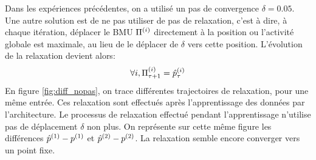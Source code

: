 \documentclass[../main]{subfiles}
\begin{document}
Dans les expériences précédentes, on a utilisé un pas de convergence $\delta=0.05$. Une autre solution est de ne pas utiliser de pas de relaxation, c'est à dire, à chaque itération, déplacer le BMU $\Pi^{({i})}$ directement à la position ou l'activité globale est maximale, au lieu de le déplacer de $\delta$ vers cette position.
L'évolution de la relaxation devient alors:
\begin{equation}
\forall i, \Pi^{({i})}_{\tau+1} = \hat{p}^{({i})}_{\tau}
\end{equation}
En figure \ref{fig:diff_nopas}, on trace différentes trajectoires de relaxation, pour une même entrée. Ces relaxation sont effectués après l'apprentissage des données par l'architecture. Le processus de relaxation effectué pendant l'apprentissage n'utilise pas de déplacement $\delta$ non plus. 
On représente sur cette même figure les différences ${\hat{p}}^{({1})} - p^{({1})}$ et ${\hat{p}}^{({2})} - p^{({2})}$. La relaxation semble encore converger vers un point fixe.
\end{document}
